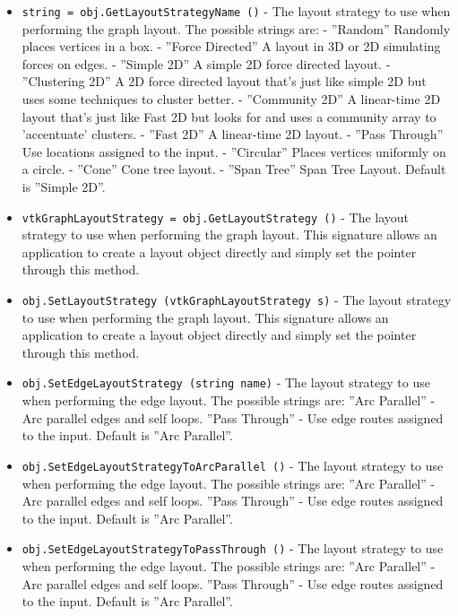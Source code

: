 \begin{itemize}
\item  \verb|string = obj.GetLayoutStrategyName ()| -  The layout strategy to use when performing the graph layout.
 The possible strings are:
  - ''Random''         Randomly places vertices in a box.
  - ''Force Directed'' A layout in 3D or 2D simulating forces on edges.
  - ''Simple 2D''      A simple 2D force directed layout.
  - ''Clustering 2D''  A 2D force directed layout that's just like
                     simple 2D but uses some techniques to cluster better.
  - ''Community 2D''   A linear-time 2D layout that's just like
                    Fast 2D but looks for and uses a community 
                    array to 'accentuate' clusters.
  - ''Fast 2D''       A linear-time 2D layout.
  - ''Pass Through''  Use locations assigned to the input.
  - ''Circular''      Places vertices uniformly on a circle.
  - ''Cone''          Cone tree layout.
  - ''Span Tree''     Span Tree Layout.
 Default is ''Simple 2D''.

\item  \verb|vtkGraphLayoutStrategy = obj.GetLayoutStrategy ()| -  The layout strategy to use when performing the graph layout.
 This signature allows an application to create a layout
 object directly and simply set the pointer through this method.

\item  \verb|obj.SetLayoutStrategy (vtkGraphLayoutStrategy s)| -  The layout strategy to use when performing the graph layout.
 This signature allows an application to create a layout
 object directly and simply set the pointer through this method.

\item  \verb|obj.SetEdgeLayoutStrategy (string name)| -  The layout strategy to use when performing the edge layout.
 The possible strings are:
   ''Arc Parallel''   - Arc parallel edges and self loops.
   ''Pass Through''   - Use edge routes assigned to the input.
 Default is ''Arc Parallel''.

\item  \verb|obj.SetEdgeLayoutStrategyToArcParallel ()| -  The layout strategy to use when performing the edge layout.
 The possible strings are:
   ''Arc Parallel''   - Arc parallel edges and self loops.
   ''Pass Through''   - Use edge routes assigned to the input.
 Default is ''Arc Parallel''.

\item  \verb|obj.SetEdgeLayoutStrategyToPassThrough ()| -  The layout strategy to use when performing the edge layout.
 The possible strings are:
   ''Arc Parallel''   - Arc parallel edges and self loops.
   ''Pass Through''   - Use edge routes assigned to the input.
 Default is ''Arc Parallel''.


\end{itemize}
